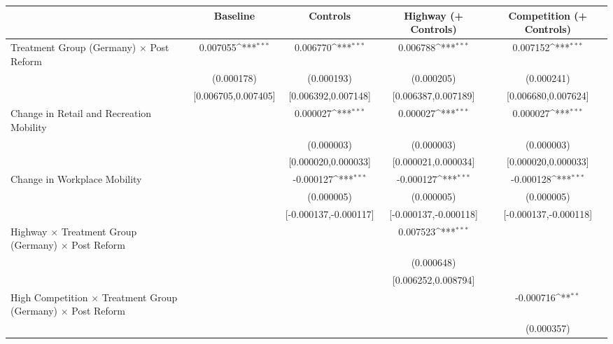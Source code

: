 {
\def\sym#1{\ifmmode^{#1}\else\(^{#1}\)\fi}
\begin{tabular}{l*{4}{c}}
\toprule
                    &\multicolumn{1}{c}{Baseline}&\multicolumn{1}{c}{Controls}&\multicolumn{1}{c}{Highway (+ Controls)}&\multicolumn{1}{c}{Competition (+ Controls)}\\
\midrule
Treatment Group (Germany) $\times$ Post Reform&    0.007055\sym{***}&    0.006770\sym{***}&    0.006788\sym{***}&    0.007152\sym{***}\\
                    &  (0.000178)         &  (0.000193)         &  (0.000205)         &  (0.000241)         \\
                    &[0.006705,0.007405]         &[0.006392,0.007148]         &[0.006387,0.007189]         &[0.006680,0.007624]         \\
Change in Retail and Recreation Mobility&                     &    0.000027\sym{***}&    0.000027\sym{***}&    0.000027\sym{***}\\
                    &                     &  (0.000003)         &  (0.000003)         &  (0.000003)         \\
                    &                     &[0.000020,0.000033]         &[0.000021,0.000034]         &[0.000020,0.000033]         \\
Change in Workplace Mobility&                     &   -0.000127\sym{***}&   -0.000127\sym{***}&   -0.000128\sym{***}\\
                    &                     &  (0.000005)         &  (0.000005)         &  (0.000005)         \\
                    &                     &[-0.000137,-0.000117]         &[-0.000137,-0.000118]         &[-0.000137,-0.000118]         \\
Highway $\times$ Treatment Group (Germany) $\times$ Post Reform&                     &                     &    0.007523\sym{***}&                     \\
                    &                     &                     &  (0.000648)         &                     \\
                    &                     &                     &[0.006252,0.008794]         &                     \\
High Competition $\times$ Treatment Group (Germany) $\times$ Post Reform&                     &                     &                     &   -0.000716\sym{**} \\
                    &                     &                     &                     &  (0.000357)         \\

\end{tabular}}
